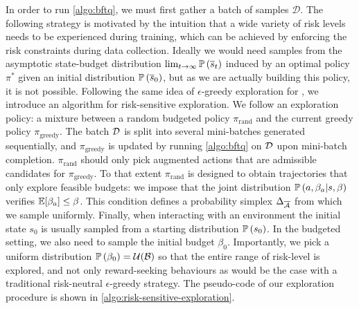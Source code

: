 In order to run \autoref{algo:bftq}, we must first gather a batch of samples $\mathcal{D}$. The following strategy is motivated by the intuition that a wide variety of risk levels needs to be experienced during training, which can be achieved by enforcing the risk constraints during data collection. Ideally we would need samples from the asymptotic state-budget distribution $\lim_{t\rightarrow\infty}\mathbb{P}\left(\overline{s}_t\right)$ induced by an optimal policy $\pi^*$ given an initial distribution $\mathbb{P}\left(\overline{s}_0\right)$, but as we are actually building this policy, it is not possible. Following the same idea of $\epsilon$-greedy exploration for \FTQ \citep{Ernst2005,Riedmiller2005}, we introduce an algorithm for risk-sensitive exploration. We follow an exploration policy: a mixture between a random budgeted policy $\pi_\text{rand}$ and the current greedy policy $\pi_\text{greedy}$. The batch $\mathcal{D}$ is split into several mini-batches generated sequentially, and $\pi_\text{greedy}$ is updated by running \autoref{algo:bftq} on $\mathcal{D}$ upon mini-batch completion. $\pi_\text{rand}$ should only pick augmented actions that are admissible candidates for $\pi_\text{greedy}$. To that extent $\pi_\text{rand}$ is designed to obtain trajectories that only explore feasible budgets: we impose that the joint distribution $\mathbb{P}\left(a, \beta_a|s, \beta\right)$ verifies $\operatorname*{\mathbb{E}}[\beta_a]\leq\beta$. This condition defines a probability simplex $\Delta_{\overline{\mathcal{A}}}$ from which we sample uniformly. Finally, when interacting with an environment the initial state $s_0$ is usually sampled from a starting distribution $\mathbb{P}\left(s_0\right)$. In the budgeted setting, we also need to sample the initial budget $\beta_0$. Importantly, we pick a uniform distribution $\mathbb{P}\left(\beta_0\right) = \mathcal{U}(\mathcal{B})$ so that the entire range of risk-level is explored, and not only reward-seeking behaviours as would be the case with a traditional risk-neutral $\epsilon$-greedy strategy. The pseudo-code of our exploration procedure is shown in \autoref{algo:risk-sensitive-exploration}.%






